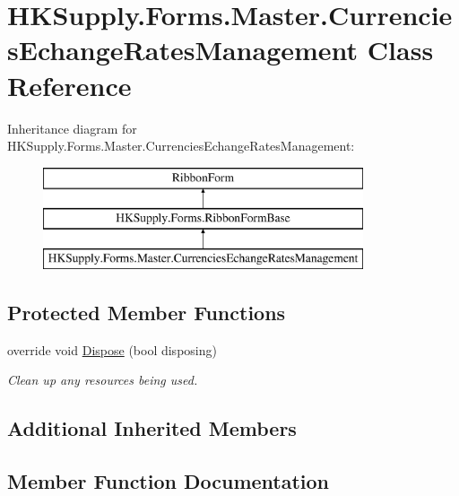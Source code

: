 \hypertarget{class_h_k_supply_1_1_forms_1_1_master_1_1_currencies_echange_rates_management}{}\section{H\+K\+Supply.\+Forms.\+Master.\+Currencies\+Echange\+Rates\+Management Class Reference}
\label{class_h_k_supply_1_1_forms_1_1_master_1_1_currencies_echange_rates_management}
Inheritance diagram for H\+K\+Supply.\+Forms.\+Master.\+Currencies\+Echange\+Rates\+Management\+:\begin{figure}[H]
\begin{center}
\leavevmode
\includegraphics[height=3.000000cm]{class_h_k_supply_1_1_forms_1_1_master_1_1_currencies_echange_rates_management}
\end{center}
\end{figure}
\subsection*{Protected Member Functions}
\begin{DoxyCompactItemize}
\item 
override void \mbox{\hyperlink{class_h_k_supply_1_1_forms_1_1_master_1_1_currencies_echange_rates_management_abad34f59c7b089f1a5a2df80fa66ba07}{Dispose}} (bool disposing)
\begin{DoxyCompactList}\small\item\em Clean up any resources being used. \end{DoxyCompactList}\end{DoxyCompactItemize}
\subsection*{Additional Inherited Members}


\subsection{Member Function Documentation}
\mbox{\label{class_h_k_supply_1_1_forms_1_1_master_1_1_currencies_echange_rates_management_abad34f59c7b089f1a5a2df80fa66ba07}} 
